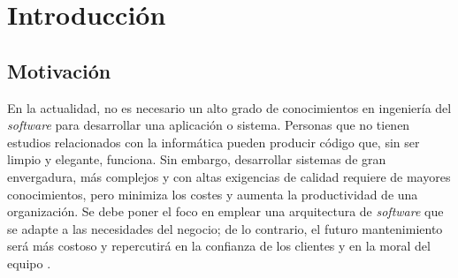 \documentclass[11pt,spanish,listoffigures]{tfgetsinf}
\begin{document}
\newpage

\begin{abstract}[english]

Architectures based on microservices are a latest trend where software application consists of small and autonomous services that cooperate between themselves offering several functionalities. The aim of this work is to validate advantages and drawbacks from an architecture based on microservices compared to a traditional or monolithic one with a study case evaluation. With this purpose, influence of microservices on software development process was reviewed likewise inspection of the main tools associated with its deployment.

The study case consisted of the design and implementation of a mobile application for electronic commerce (e-shop) purposes. The server-side was twice implemented following different architectures: one microservices-based and a monolithic one. The system deployment employed Docker containers orchestrated by Kubernetes tool within Microsoft Azure platform.

Finally, both solutions were compared in front of diverse non-functional requirements, such us availability or fault tolerance, and several maintenance situations.

\end{abstract}


\mainmatter


\chapter{Introducci\'on}

\section{Motivaci\'on}

En la actualidad, no es necesario un alto grado de conocimientos en ingeniería del \textit{software} para desarrollar una aplicación o sistema. Personas que no tienen estudios relacionados con la informática pueden producir código que, sin ser limpio y elegante, funciona. Sin embargo, desarrollar sistemas de gran envergadura, más complejos y con altas exigencias de calidad requiere de mayores conocimientos, pero minimiza los costes y aumenta la productividad de una organización. Se debe poner el foco en emplear una arquitectura de \textit{software} que se adapte a las necesidades del negocio; de lo contrario, el futuro mantenimiento será más costoso y repercutirá en la confianza de los clientes y en la moral del equipo \cite{Martin2017}.
\end{document}
